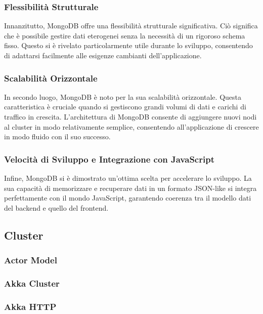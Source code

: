 \subsubsection{Flessibilità Strutturale}

Innanzitutto, MongoDB offre una flessibilità strutturale significativa. Ciò significa che è possibile gestire dati eterogenei senza la necessità di un rigoroso schema fisso. Questo si è rivelato particolarmente utile durante lo sviluppo, consentendo di adattarsi facilmente alle esigenze cambianti dell'applicazione.

\subsubsection{Scalabilità Orizzontale}

In secondo luogo, MongoDB è noto per la sua scalabilità orizzontale. Questa caratteristica è cruciale quando si gestiscono grandi volumi di dati e carichi di traffico in crescita. L'architettura di MongoDB consente di aggiungere nuovi nodi al cluster in modo relativamente semplice, consentendo all'applicazione di crescere in modo fluido con il suo successo.

\subsubsection{Velocità di Sviluppo e Integrazione con JavaScript}

Infine, MongoDB si è dimostrato un'ottima scelta per accelerare lo sviluppo. La sua capacità di memorizzare e recuperare dati in un formato JSON-like si integra perfettamente con il mondo JavaScript, garantendo coerenza tra il modello dati del backend e quello del frontend.


\subsection{Cluster}
\subsubsection{Actor Model}
\subsubsection{Akka Cluster}
\subsubsection{Akka HTTP}


